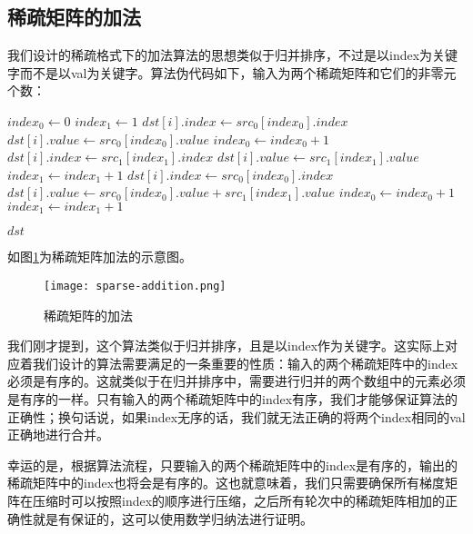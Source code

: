 \subsection{稀疏矩阵的加法}
我们设计的稀疏格式下的加法算法的思想类似于归并排序，不过是以index为关键字而不是以val为关键字。算法伪代码如下，输入为两个稀疏矩阵和它们的非零元个数：
\makeatletter
\def\BState{\State\hskip-\ALG@thistlm}
\makeatother
\begin{algorithm}
\begin{algorithmic}[1]
\State $index_0 \gets 0$
\State $index_1 \gets 1$
\State $dst[i].index \gets src_0[index_0].index$
\State $dst[i].value \gets src_0[index_0].value$
\State $index_0 \gets index_0 + 1$
\State $dst[i].index \gets src_1[index_1].index$
\State $dst[i].value \gets src_1[index_1].value$
\State $index_1 \gets index_1 + 1$
\State $dst[i].index \gets src_0[index_0].index$
\State $dst[i].value \gets src_0[index_0].value + src_1[index_1].value$
\State $index_0 \gets index_0 + 1$
\State $index_1 \gets index_1 + 1$

\EndIf
\EndFor
\State \Return $dst$
\EndProcedure
\end{algorithmic}
\end{algorithm}


如图\ref{fig:sparse-addition}为稀疏矩阵加法的示意图。

\begin{figure}[ht] %
  \centering
  \texttt{[image: sparse-addition.png]}
  \caption{稀疏矩阵的加法}
  \label{fig:sparse-addition}
\end{figure}

我们刚才提到，这个算法类似于归并排序，且是以index作为关键字。这实际上对应着我们设计的算法需要满足的一条重要的性质：输入的两个稀疏矩阵中的index必须是有序的。这就类似于在归并排序中，需要进行归并的两个数组中的元素必须是有序的一样。只有输入的两个稀疏矩阵中的index有序，我们才能够保证算法的正确性；换句话说，如果index无序的话，我们就无法正确的将两个index相同的val正确地进行合并。

幸运的是，根据算法流程，只要输入的两个稀疏矩阵中的index是有序的，输出的稀疏矩阵中的index也将会是有序的。这也就意味着，我们只需要确保所有梯度矩阵在压缩时可以按照index的顺序进行压缩，之后所有轮次中的稀疏矩阵相加的正确性就是有保证的，这可以使用数学归纳法进行证明。

